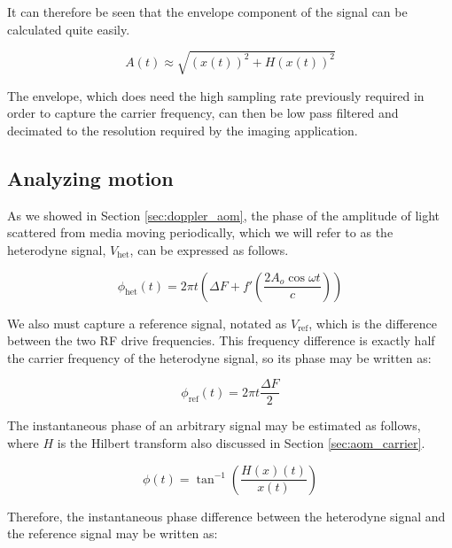 It can therefore be seen that the envelope component of the signal can be calculated quite easily. \cite{oppenheim}

\begin{equation}
A(t) \approx \sqrt{(x(t))^2 + H(x(t))^2}
\end{equation}

The envelope, which does need the high sampling rate previously required in order to capture the carrier frequency, can then be low pass filtered and decimated to the resolution required by the imaging application.

\subsection{Analyzing motion}
\label{sec:sigproc_mo_anal}


As we showed in Section \ref{sec:doppler_aom}, the phase of the amplitude of light scattered from media moving periodically, which we will refer to as the heterodyne signal, $V_{\mathrm{het}}$, can be expressed as follows.

\begin{equation}
\phi_{\mathrm{het}}(t) = 2 \pi t \left(\Delta F + f' \left( \frac{2 A_o \cos{\omega t}}{c} \right)   \right) 
\end{equation}

We also must capture a reference signal, notated as $V_{\mathrm{ref}}$, which is the difference between the two RF drive frequencies. This frequency difference is exactly half the carrier frequency of the heterodyne signal, so its phase may be written as:

\begin{equation}
\phi_{\mathrm{ref}}(t) = 2 \pi t \frac{\Delta F}{2}
\end{equation}

The instantaneous phase of an arbitrary signal may be estimated as follows, where $H$ is the Hilbert transform also discussed in Section \ref{sec:aom_carrier}.

\begin{equation}
\phi(t) = \tan^{-1} \left( \frac{H(x)(t)}{x(t)} \right)
\end{equation}

Therefore, the instantaneous phase difference between the heterodyne signal and the reference signal may be written as:


